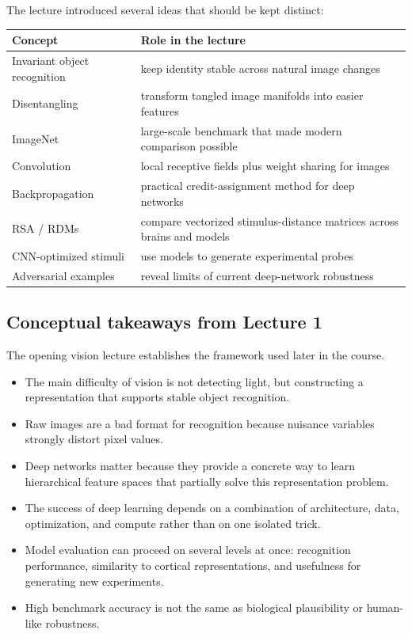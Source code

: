 The lecture introduced several ideas that should be kept distinct:

\begin{center}
\begin{tabular}{lp{}}
\hline
Concept & Role in the lecture \\
\hline
Invariant object recognition & keep identity stable across natural image changes \\
Disentangling & transform tangled image manifolds into easier features \\
ImageNet & large-scale benchmark that made modern comparison possible \\
Convolution & local receptive fields plus weight sharing for images \\
Backpropagation & practical credit-assignment method for deep networks \\
RSA / RDMs & compare vectorized stimulus-distance matrices across brains and models \\
CNN-optimized stimuli & use models to generate experimental probes \\
Adversarial examples & reveal limits of current deep-network robustness \\
\hline
\end{tabular}
\end{center}

\subsection{Conceptual takeaways from Lecture 1}

The opening vision lecture establishes the framework used later in the course.

\begin{itemize}
    \item The main difficulty of vision is not detecting light, but constructing a representation that supports stable object recognition.
    \item Raw images are a bad format for recognition because nuisance variables strongly distort pixel values.
    \item Deep networks matter because they provide a concrete way to learn hierarchical feature spaces that partially solve this representation problem.
    \item The success of deep learning depends on a combination of architecture, data, optimization, and compute rather than on one isolated trick.
    \item Model evaluation can proceed on several levels at once: recognition performance, similarity to cortical representations, and usefulness for generating new experiments.
    \item High benchmark accuracy is not the same as biological plausibility or human-like robustness.
\end{itemize}

